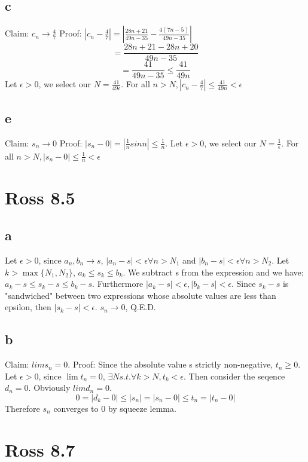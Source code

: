 \documentclass[12pt]{article}
\begin{document}
\subsection{c}
Claim: $c_n \to \frac{4}{7}$
\newline
Proof: $|c_n- \frac{4}{7}| = |\frac{28n+21}{49n-35} - \frac{4(7n-5)}{49n-35}|$
$$= \frac{28n+21-28n+20}{49n-35}$$
$$= \frac{41}{49n-35} \leq \frac{41}{49n}$$
\newline
Let  $\epsilon > 0$, we select our $N = \frac{41}{49\epsilon}$. For all $n>N, |c_n- \frac{4}{7}| \leq \frac{41}{49n} < \epsilon$

\subsection{e}
Claim: $s_n \to 0$
\newline
Proof: $|s_n - 0| = |\frac{1}{n}sin n| \leq \frac{1}{n}$.
\newline
Let  $\epsilon > 0$, we select our $N = \frac{1}{\epsilon}$. For all $n>N, |s_n-0| \leq \frac{1}{n} < \epsilon$
\newpage


\section{Ross 8.5}
\subsection{a}
Let $\epsilon > 0$, since $a_n, b_n \to s$, $|a_n-s|<\epsilon \forall n > N_1$ and $|b_n-s|<\epsilon \forall n > N_2$.
\newline
Let $k> \max \{ N_1, N_2\}$, $a_k \leq s_k \leq b_k$. We subtract s from the expression and we have: $a_k-s \leq s_k -s \leq b_k-s$. Furthermore $|a_k-s|<\epsilon, |b_k - s| < \epsilon$.
\newline
Since $s_k-s$ is "sandwiched" between two expressions whose absolute values are less than epsilon, then $|s_k-s|<\epsilon$.
\newline
$s_n \to 0$, Q.E.D.

\subsection{b}
Claim: $lim s_n = 0$.
\newline
Proof:
Since the absolute value s strictly non-negative, $t_n \geq 0$. Let $\epsilon>0$, since $\lim t_n = 0$, $\exists N s.t. \forall k> N, t_k < \epsilon$. Then consider the seqence $d_n = 0$. Obviously $lim d_n = 0$.
\newline
$$0 = |d_k-0| \leq |s_n| = |s_n - 0| \leq t_n = |t_n - 0|$$
Therefore $s_n$ converges to 0 by squeeze lemma.
\newpage


\section{Ross 8.7}
\end{document}
